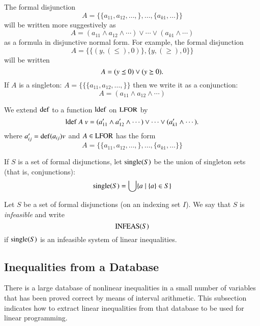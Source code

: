 \begin{remark}
The formal disjunction
    $$A = \{\{a_{11},a_{12},\ldots,\},\ldots,\{a_{k1},\ldots\}\}$$
will be written more suggestively as
    $$A = (a_{11}\wedge a_{12}\wedge\cdots) \vee \cdots \vee (a_{k1}\wedge
    \cdots)$$
as a formula in disjunctive normal form.  For example, the formal
disjunction
    $$A =  \{\{(y,(\le),0)\},\{y,(\ge),0\}\}$$
will be written
    $$A = (y\preceq 0) \vee (y \succeq 0).$$
If $A$ is a singleton: $A = \{\{\{a_{11},a_{12},\ldots,\}\}$ then
we write it as a conjunction:
    $$
    A = (a_{11}\wedge a_{12}\wedge\cdots)
    $$
\end{remark}

We extend ${\operatorname{def}}$ to a function ${\operatorname{ldef}}$ on ${\operatorname{LFOR}}$ by
    $${\operatorname{ldef}}\ A \ v  =
    (a'_{11}\wedge a'_{12}\wedge\cdots) \vee \cdots \vee (a'_{k1}\wedge
    \cdots).$$
where $a'_{ij} = {\operatorname{def}}(a_{ij}) v$ and $A\in {\operatorname{LFOR}}$ has the
form
    $$
    A = \{\{a_{11},a_{12},\ldots,\},\ldots,\{a_{k1},\ldots\}\}$$

If $S$ is a set of formal disjunctions, let ${\operatorname{single}}(S)$ be
the union of singleton sets (that is, conjunctions):
    $$
    {\operatorname{single}}(S) = \bigcup \{a \mid \{a\} \in S\}
    $$

\begin{definition}
Let $S$ be a set of formal disjunctions (on an indexing set $I$).
We say that $S$ is {\it infeasible} and write
    $${\operatorname{INFEAS}}(S)$$
if ${\operatorname{single}}(S)$ is an infeasible system of linear
inequalities.
\end{definition}


\subsection{Inequalities from a Database}
\label{sec:lookup}

There is a large database of nonlinear inequalities in a small
number of variables that has been proved correct by means of
interval arithmetic.  This subsection indicates how to extract
linear inequalities from that database to be used for linear
programming.


